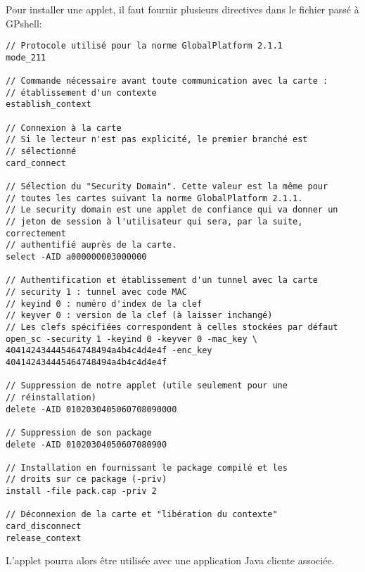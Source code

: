 \documentclass[a4paper,11pt,french]{article}
\begin{document}
Pour installer une applet, il faut fournir plusieurs directives dans le
fichier passé à GPshell:
\begin{verbatim}
// Protocole utilisé pour la norme GlobalPlatform 2.1.1
mode_211

// Commande nécessaire avant toute communication avec la carte :
// établissement d'un contexte
establish_context

// Connexion à la carte
// Si le lecteur n'est pas explicité, le premier branché est 
// sélectionné
card_connect

// Sélection du "Security Domain". Cette valeur est la même pour
// toutes les cartes suivant la norme GlobalPlatform 2.1.1.
// Le security domain est une applet de confiance qui va donner un
// jeton de session à l'utilisateur qui sera, par la suite, correctement
// authentifié auprès de la carte.
select -AID a000000003000000

// Authentification et établissement d'un tunnel avec la carte
// security 1 : tunnel avec code MAC 
// keyind 0 : numéro d'index de la clef
// keyver 0 : version de la clef (à laisser inchangé)
// Les clefs spécifiées correspondent à celles stockées par défaut
open_sc -security 1 -keyind 0 -keyver 0 -mac_key \
404142434445464748494a4b4c4d4e4f -enc_key 404142434445464748494a4b4c4d4e4f

// Suppression de notre applet (utile seulement pour une
// réinstallation)
delete -AID 0102030405060708090000                                              

// Suppression de son package
delete -AID 01020304050607080900                                                
                                                                                
// Installation en fournissant le package compilé et les
// droits sur ce package (-priv)
install -file pack.cap -priv 2
                                                                                
// Déconnexion de la carte et "libération du contexte"
card_disconnect          
release_context                                                                 
\end{verbatim}

L'applet pourra alors être utilisée avec une application Java cliente associée.
\end{document}
